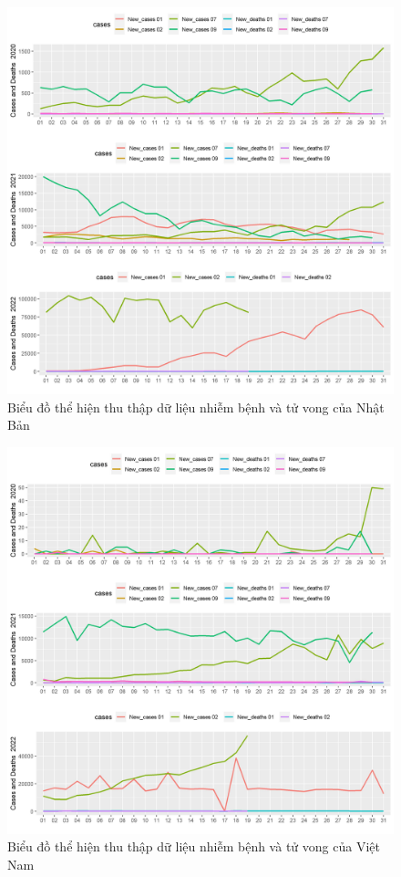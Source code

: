\documentclass[a4paper]{article}
\theoremstyle{definition}
\begin{document}
\begin{enumerate}[i)]
\begin{enumerate}[1)]
\begin{figure}[htp]
		    \includegraphics[scale = 0.7]{Images/V/v3 Japan .jpeg}
		    \caption{Biểu đồ thể hiện thu thập dữ liệu nhiễm bệnh và tử vong của Nhật Bản}
		    \label{fig:my_label}
		\end{figure}
		\begin{figure}[htp]
		    \centering
		    \includegraphics[scale = 0.7]{Images/V/v3 Vietnam .jpeg}
		    \caption{Biểu đồ thể hiện thu thập dữ liệu nhiễm bệnh và tử vong của Việt Nam}
		    \label{fig:my_label}
		\end{figure}
    

\end{enumerate}
\end{enumerate}
\end{document}
